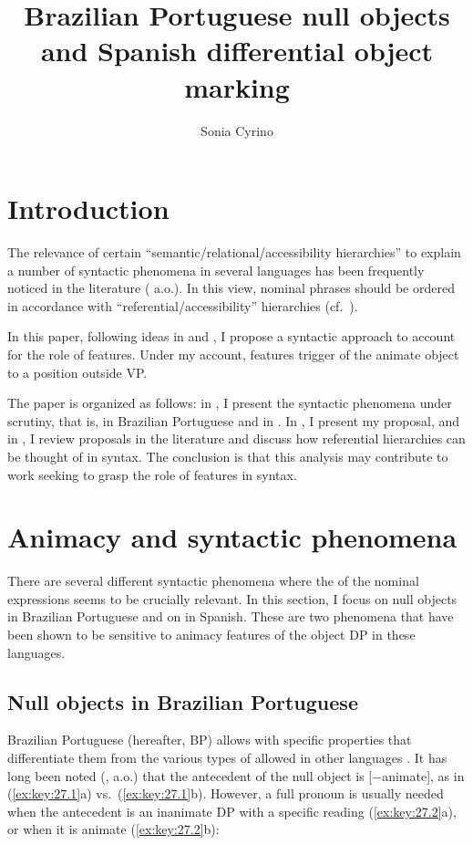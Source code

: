 \documentclass[output=paper]{langsci/langscibook}
\author{Sonia Cyrino\affiliation{University of Campinas}}
\title{Brazilian Portuguese null objects and Spanish differential object marking}
\begin{document}
\glsresetall

\section{Introduction}

The relevance of certain ``semantic/relational/accessibility hierarchies'' to
explain a number of syntactic phenomena in several languages has been
frequently noticed in the literature (\citealt{Silverstein1976,Aissen2003}
a.o.). In this view, nominal phrases should be ordered in accordance with
``referential/accessibility'' hierarchies (cf.\ \citealt{Aissen2003}).

In this paper, following ideas in \citet{Carnie2005} and \citet{Merchant2006},
I propose a syntactic approach to account for the role of 
features.  Under my account,  features trigger  of
the animate object to a position outside VP.

The paper is organized as follows: in , I present the
syntactic phenomena under scrutiny, that is,  in Brazilian
Portuguese and  in . In
, I present my proposal, and in , I
review proposals in the literature and discuss how referential hierarchies can
be thought of in syntax.  The conclusion is that this analysis may contribute
to work seeking to grasp the role of  features in syntax.

\section{Animacy and syntactic phenomena}\label{sec:key:27.2}

There are several different syntactic phenomena where the  of the
nominal expressions seems to be crucially relevant. In this section, I focus on
null objects in Brazilian Portuguese and on  in
Spanish. These are two phenomena that have been shown to be sensitive to
animacy features of the object DP in these languages.

\subsection{Null objects in Brazilian Portuguese}\label{sec:key:27.2.1}

Brazilian Portuguese (hereafter, BP) allows  with specific
properties that differentiate them from the various types of 
allowed in other languages \citep{CyrinoLopes2016}. It has long been noted
(\citealt{Omena1978,Pereira1981,Duarte1986}, a.o.) that
the antecedent of the null object is [$-$animate], as in (\ref{ex:key:27.1}a) vs.\
(\ref{ex:key:27.1}b). However, a full pronoun is usually needed when the
antecedent is an inanimate DP with a specific reading (\ref{ex:key:27.2}a), or
when it is animate (\ref{ex:key:27.2}b):
\end{document}
